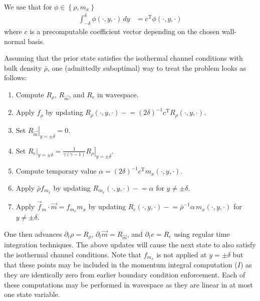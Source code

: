\documentclass[letterpaper,11pt,nointlimits,reqno]{amsart}
\begin{document}
We use that for
$\phi\in\left\{\rho,m_{x}\right\}$
\begin{align}
  \int_{-\delta}^{\delta} \phi\!\left(\cdot,y,\cdot\right)\,dy
  &=
  c^{\mathrm{T}}\phi\!\left(\cdot,y,\cdot\right)
\end{align}
where $c$ is a precomputable coefficient vector depending on the chosen
wall-normal basis.

Assuming that the prior state satisfies the isothermal channel conditions with
bulk density $\bar{\rho}$, one (admittedly suboptimal) way to treat the
problem looks as follows:
\begin{enumerate}
  \item Compute $R_{\rho}$, $R_{\vec{m}}$, and $R_{e}$ in wavespace.
  \item Apply $f_{\rho}$ by updating $R_{\rho}\!\left(\cdot,y,\cdot\right)
        -\!= \left(2\delta\right)^{-1} c^{\mathrm{T}}
        R_{\rho}\!\left(\cdot,y,\cdot\right)$.
  \item Set $\left.R_{\vec{m}}\right|_{y=\pm\delta} = 0$.
  \item Set $\left.R_{e}\right|_{y=\pm\delta} =
        \frac{1}{\gamma\left(\gamma-1\right)}
        \left.R_{\rho}\right|_{y=\pm\delta}$.
  \item Compute temporary value $\alpha =
        \left(2\delta\right)^{-1} c^{\mathrm{T}}
        m_{x}\!\left(\cdot,y,\cdot\right)$.
  \item Apply $\bar{\rho} f_{m_x}$ by updating
        $R_{m_x}\!\left(\cdot,y,\cdot\right) -\!= \alpha$ for $y\neq\pm\delta$.
  \item Apply $\vec{f}_{m}\cdot\vec{m} = f_{m_x} m_x$ by updating
        $R_{e}\!\left(\cdot,y,\cdot\right) -\!=
        \bar{\rho}^{-1} \alpha \, m_{x}\!\left(\cdot,y,\cdot\right)$
        for $y\neq\pm\delta$.
\end{enumerate}
One then advances $\partial_{t}\rho = R_{\rho}$, $\partial_{t} \vec{m} =
R_{\vec{m}}$, and $\partial_{t} e = R_{e}$ using regular time integration
techniques.  The above updates will cause the next state to also satisfy the
isothermal channel conditions.  Note that $f_{m_x}$ is not applied at
$y=\pm\delta$ but that these points may be included in the momentum integral
computation ($I$) as they are identically zero from earlier boundary condition
enforcement.  Each of these computations may be performed in wavespace as they
are linear in at most one state variable.




\end{document}
